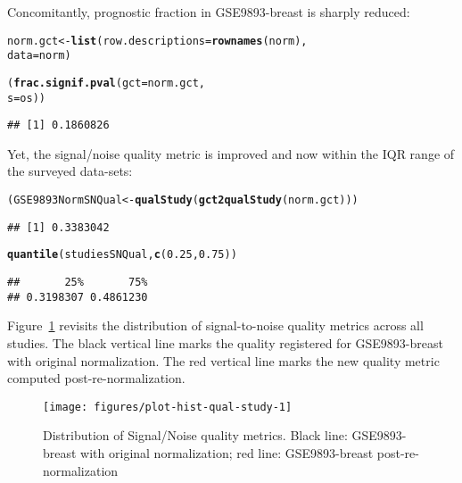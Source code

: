 \documentclass{article}\usepackage[]{graphicx}\usepackage[]{color}
\makeatletter
\def\maxwidth{ %
  \ifdim\Gin@nat@width>\linewidth
    \linewidth
  \else
    \Gin@nat@width
  \fi
}
\newcommand{\hlnum}[1]{\textcolor[rgb]{0.686,0.059,0.569}{#1}}%
\newcommand{\hlstd}[1]{\textcolor[rgb]{0.345,0.345,0.345}{#1}}%
\newcommand{\hlkwb}[1]{\textcolor[rgb]{0.69,0.353,0.396}{#1}}%
\newcommand{\hlkwc}[1]{\textcolor[rgb]{0.333,0.667,0.333}{#1}}%
\newcommand{\hlkwd}[1]{\textcolor[rgb]{0.737,0.353,0.396}{\textbf{#1}}}%
\newenvironment{kframe}{%
 \def\at@end@of@kframe{}%
 \ifinner\ifhmode%
  \def\at@end@of@kframe{\end{minipage}}%
  \begin{minipage}{\columnwidth}%
 \fi\fi%
 \def\FrameCommand##1{\hskip\@totalleftmargin \hskip-\fboxsep
 \colorbox{shadecolor}{##1}\hskip-\fboxsep
     \hskip-\linewidth \hskip-\@totalleftmargin \hskip\columnwidth}%
 \MakeFramed {\advance\hsize-\width
   \@totalleftmargin\z@ \linewidth\hsize
   \@setminipage}}%
 {\par\unskip\endMakeFramed%
 \at@end@of@kframe}
\newenvironment{knitrout}{}{} %
\makeatother
\begin{document}
Concomitantly, prognostic fraction in \textsf{GSE9893-breast} is sharply
reduced:

\begin{knitrout}\small
{}\color{fgcolor}\begin{kframe}
\begin{alltt}
\hlstd{norm.gct} \hlkwb{<-} \hlkwd{list} \hlstd{(}\hlkwc{row.descriptions} \hlstd{=} \hlkwd{rownames} \hlstd{(norm),}
                  \hlkwc{data} \hlstd{= norm)}

\hlstd{(}\hlkwd{frac.signif.pval} \hlstd{(}\hlkwc{gct} \hlstd{= norm.gct,}
                   \hlkwc{s} \hlstd{= os))}
\end{alltt}
\begin{verbatim}
## [1] 0.1860826
\end{verbatim}
\end{kframe}
\end{knitrout}

Yet, the signal/noise quality metric is improved and now within the IQR range of
the surveyed data-sets:

\begin{knitrout}\small
{}\color{fgcolor}\begin{kframe}
\begin{alltt}
\hlstd{(GSE9893NormSNQual} \hlkwb{<-} \hlkwd{qualStudy} \hlstd{(}\hlkwd{gct2qualStudy} \hlstd{(norm.gct)))}
\end{alltt}
\begin{verbatim}
## [1] 0.3383042
\end{verbatim}
\begin{alltt}
\hlkwd{quantile} \hlstd{(studiesSNQual,} \hlkwd{c} \hlstd{(}\hlnum{0.25}\hlstd{,} \hlnum{0.75}\hlstd{))}
\end{alltt}
\begin{verbatim}
##       25%       75% 
## 0.3198307 0.4861230
\end{verbatim}
\end{kframe}
\end{knitrout}

Figure~\ref{fig:plot-hist-qual-study} revisits the distribution of
signal-to-noise quality metrics across all studies.  The black vertical line
marks the quality registered for \textsf{GSE9893-breast} with original
normalization.  The red vertical line marks the new quality metric computed
post-re-normalization.

\begin{knitrout}\small
{}\color{fgcolor}\begin{figure}

{\centering \texttt{[image: figures/plot-hist-qual-study-1]} 

}

\caption[Distribution of Signal/Noise quality metrics]{Distribution of Signal/Noise quality metrics. Black line: GSE9893-breast with original normalization; red line: GSE9893-breast post-re-normalization\label{fig:plot-hist-qual-study}}
\end{figure}


\end{knitrout}
\end{document}

